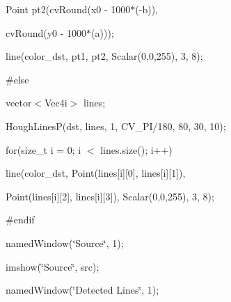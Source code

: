 {\ttfamily }

{\ttfamily Point pt2(cv\+Round(x0 -\/ 1000$\ast$(-\/b)),}

{\ttfamily }

{\ttfamily }

{\ttfamily cv\+Round(y0 -\/ 1000$\ast$(a)));}

{\ttfamily }

{\ttfamily }

{\ttfamily line(color\+\_\+dst, pt1, pt2, Scalar(0,0,255), 3, 8);}

{\ttfamily }

{\ttfamily }

{\ttfamily \#else}

{\ttfamily }

{\ttfamily }

{\ttfamily vector$<$\+Vec4i$>$ lines;}

{\ttfamily }

{\ttfamily }

{\ttfamily Hough\+LinesP(dst, lines, 1, C\+V\+\_\+\+P\+I/180, 80, 30, 10);}

{\ttfamily }

{\ttfamily }

{\ttfamily for(size\+\_\+t i = 0; i $<$ lines.\+size(); i++)}

{\ttfamily }

{\ttfamily }

{\ttfamily line(color\+\_\+dst, Point(lines\mbox{[}i\mbox{]}\mbox{[}0\mbox{]}, lines\mbox{[}i\mbox{]}\mbox{[}1\mbox{]}),}

{\ttfamily }

{\ttfamily }

{\ttfamily Point(lines\mbox{[}i\mbox{]}\mbox{[}2\mbox{]}, lines\mbox{[}i\mbox{]}\mbox{[}3\mbox{]}), Scalar(0,0,255), 3, 8);}

{\ttfamily }

{\ttfamily }

{\ttfamily \#endif}

{\ttfamily }

{\ttfamily }

{\ttfamily named\+Window(\char`\"{}\+Source\char`\"{}, 1);}

{\ttfamily }

{\ttfamily }

{\ttfamily imshow(\char`\"{}\+Source\char`\"{}, src);}

{\ttfamily }

{\ttfamily }

{\ttfamily named\+Window(\char`\"{}\+Detected Lines\char`\"{}, 1);}

